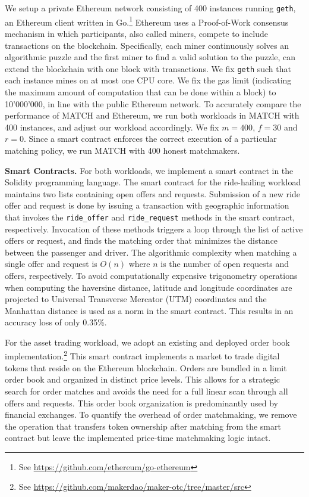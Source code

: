 We setup a private Ethereum network consisting of 400 instances running \texttt{geth}, an Ethereum client written in Go.\footnote{See \url{https://github.com/ethereum/go-ethereum}}
Ethereum uses a Proof-of-Work consensus mechanism in which participants, also called miners, compete to include transactions on the blockchain.
Specifically, each miner continuously solves an algorithmic puzzle and the first miner to find a valid solution to the puzzle, can extend the blockchain with one block with transactions.
We fix \texttt{geth} such that each instance mines on at most one CPU core.
We fix the gas limit (indicating the maximum amount of computation that can be done within a block) to 10'000'000, in line with the public Ethereum network.
To accurately compare the performance of MATCH and Ethereum, we run both workloads in MATCH with 400 instances, and adjust our workload accordingly.
We fix $ m = 400 $, $ f = 30 $ and $ r = 0 $.
Since a smart contract enforces the correct execution of a particular matching policy, we run MATCH with 400 honest matchmakers.

\textbf{Smart Contracts.}
For both workloads, we implement a smart contract in the Solidity programming language.
The smart contract for the ride-hailing workload maintains two lists containing open offers and requests.
Submission of a new ride offer and request is done by issuing a transaction with geographic information that invokes the \texttt{ride\_offer} and \texttt{ride\_request} methods in the smart contract, respectively.
Invocation of these methods triggers a loop through the list of active offers or request, and finds the matching order that minimizes the distance between the passenger and driver.
The algorithmic complexity when matching a single offer and request is $ O(n) $ where $ n $ is the number of open requests and offers, respectively.
To avoid computationally expensive trigonometry operations when computing the haversine distance, latitude and longitude coordinates are projected to Universal Transverse Mercator (UTM) coordinates and the Manhattan distance is used as a norm in the smart contract.
This results in an accuracy loss of only 0.35\%.

For the asset trading workload, we adopt an existing and deployed order book implementation.\footnote{See \url{https://github.com/makerdao/maker-otc/tree/master/src}}
This smart contract implements a market to trade digital tokens that reside on the Ethereum blockchain.
Orders are bundled in a limit order book and organized in distinct price levels.
This allows for a strategic search for order matches and avoids the need for a full linear scan through all offers and requests.
This order book organization is predominantly used by financial exchanges.
To quantify the overhead of order matchmaking, we remove the operation that transfers token ownership after matching from the smart contract but leave the implemented price-time matchmaking logic intact.

